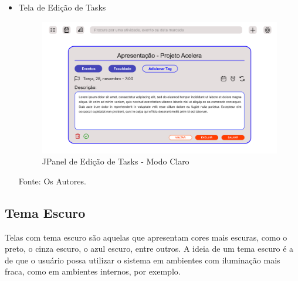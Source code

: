 \documentclass[a4paper,12pt]{article}
\begin{document}
\begin{itemize}
	\item Tela de Edição de Tasks
	\begin{figure}[H]
		\centering
		\includegraphics[scale=0.19]{prototypes/white/Edit Task Panel Window.png}
		\caption{JPanel de Edição de Tasks - Modo Claro}
	\end{figure}
	\noindent Fonte: Os Autores.
\end{itemize}	

\pagebreak
\subsection{Tema Escuro}
Telas com tema escuro são aquelas que apresentam cores mais escuras, como o preto, o cinza escuro, o azul escuro, entre outros. A ideia de um tema escuro 
é a de que o usuário possa utilizar o sistema em ambientes com iluminação mais fraca, como em ambientes internos, por exemplo.
\end{document}
